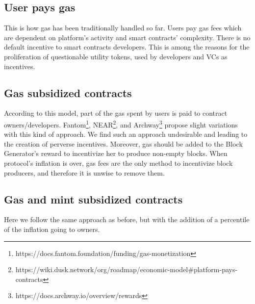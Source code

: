 \documentclass[twocolumn, nofootinbib]{revtex4-2} %
\begin{document}
    \subsection{User pays gas}\label{sec:innovative-cost-management-approach:user-pays-gas}
    This is how gas has been traditionally handled so far.
    Users pay gas fees which are dependent on platform's activity and smart
    contracts' complexity.
    There is no default incentive to smart contracts developers.
    This is among the reasons for the proliferation of questionable utility
    tokens, used by developers and VCs as incentives.

    \subsection{Gas subsidized contracts}\label{sec:innovative-cost-management-approach:gas-subsidized-contracts}
    According to this model, part of the gas spent by users is paid to contract
    owners/developers.
    Fantom\footnote{https://docs.fantom.foundation/funding/gas-monetization},
    NEAR\footnote{https://wiki.dusk.network/org/roadmap/economic-model\#platform-pays-contracts},
    and Archway\footnote{https://docs.archway.io/overview/rewards} propose slight
    variations with this kind of approach.
    We find such an approach undesirable and leading to the creation of perverse
    incentives.
    Moreover, gas should be added to the Block Generator's reward to
    incentivize her to produce non-empty blocks.
    When protocol's inflation is over, gas fees are the only method to
    incentivize block producers, and therefore it is unwise to remove them.

    \subsection{Gas and mint subsidized contracts}\label{sec:innovative-cost-management-approach:gas-and-mint-subsidized-contracts}
    Here we follow the same approach as before, but with the addition of a percentile of the inflation going to
    owners.
    
\end{document}
